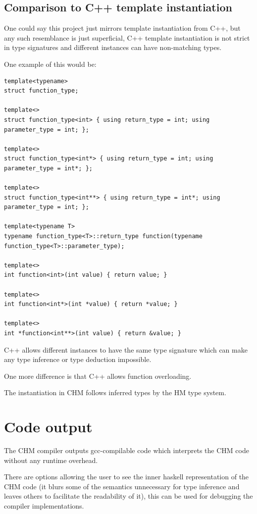 \subsection{Comparison to C++ template instantiation}

One could say this project just mirrors template instantiation from C++, but any such resemblance is just
superficial, C++ template instantiation is not strict in type signatures and different instances can have
non-matching types.

One example of this would be:

\begin{lstlisting}
template<typename>
struct function_type;

template<>
struct function_type<int> { using return_type = int; using parameter_type = int; };

template<>
struct function_type<int*> { using return_type = int; using parameter_type = int*; };

template<>
struct function_type<int**> { using return_type = int*; using parameter_type = int; };

template<typename T>
typename function_type<T>::return_type function(typename function_type<T>::parameter_type);

template<>
int function<int>(int value) { return value; }

template<>
int function<int*>(int *value) { return *value; }

template<>
int *function<int**>(int value) { return &value; }
\end{lstlisting}

C++ allows different instances to have the same type signature which can make any type inference or type deduction
impossible.

One more difference is that C++ allows function overloading. %

The instantiation in CHM follows inferred types by the HM type system.

\section{Code output}

The CHM compiler outputs gcc-compilable code which interprets the CHM code without any runtime overhead. %

There are options allowing the user to see the inner haskell representation of the CHM code (it blurs some of the semantics
unnecessary for type inference and leaves others to facilitate the readability of it), this can be used for debugging
the compiler implementations. %


